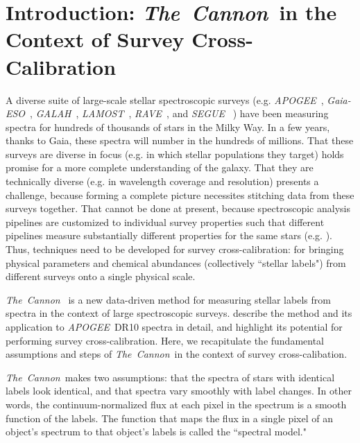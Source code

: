 \documentclass[12pt, preprint]{aastex}
\newcommand{\tc}{\textsl{The~Cannon}}
\newcommand{\apogee}{\textsl{APOGEE}}
\newcommand{\lamost}{\textsl{LAMOST}}
\newcommand{\segue}{\textsl{SEGUE}}
\newcommand{\rave}{\textsl{RAVE}}
\newcommand{\galah}{\textsl{GALAH}}
\newcommand{\gaiaeso}{\textsl{Gaia-ESO}}
\begin{document}

\section{Introduction: \tc\ in the Context of Survey Cross-Calibration}

A diverse suite of large-scale stellar spectroscopic surveys
(e.g. 
\apogee\ \citep{Majewski2012},
\gaiaeso\ \citep{Gilmore2012},
\galah\ \citep{Freeman2012},
\lamost\ \citep{Newberg2012},
\rave\ \citep{Steinmetz2006}, and
\segue\ \citep{Beers}
)
have been measuring spectra for hundreds of thousands of stars in the Milky Way. 
In a few years, thanks to Gaia, these spectra will number in the hundreds of millions. 
That these surveys are diverse in focus (e.g. in which stellar populations
they target) holds promise for a more complete understanding of the galaxy. 
That they are technically diverse (e.g. in 
wavelength coverage and resolution) presents a challenge,
because forming a complete picture necessites stitching data from 
these surveys together. 
That cannot be done at present, because spectroscopic analysis pipelines
are customized to individual survey properties such that different 
pipelines measure substantially different properties for the same stars 
(e.g. \citet{Smiljanic2014}). 
Thus, techniques need to be developed for survey cross-calibration: 
for bringing physical parameters and chemical
abundances (collectively ``stellar labels") from different surveys 
onto a single physical scale. 

\tc\ \citep{ness2015} is a new data-driven method for measuring stellar labels 
from spectra in the context of large spectroscopic surveys. \citet{ness2015} 
describe the method and its application to \apogee\ DR10 spectra in detail,
and highlight its potential for performing survey
cross-calibration. Here, we recapitulate the fundamental assumptions and steps
of \tc\ in the context of survey cross-calibation. 

\tc\ makes two assumptions: that the spectra of stars with identical labels look identical,
and that spectra vary smoothly with label changes. In other words, the continuum-normalized flux at each pixel in the spectrum is a smooth function of the labels. The function
that maps the flux in a single pixel of an object's spectrum to that object's labels 
is called the ``spectral model." 
\end{document}
